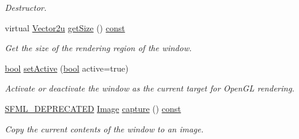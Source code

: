 \begin{DoxyCompactItemize}
\begin{DoxyCompactList}\small\item\em Destructor. \end{DoxyCompactList}\item 
virtual \hyperlink{namespacesf_a41039649eb65ea7646e2b97cfe124b4f}{Vector2u} \hyperlink{classsf_1_1_render_window_a2c7ff414be32621a453745cf2a0f8a3e}{get\-Size} () \hyperlink{term__entry_8h_a57bd63ce7f9a353488880e3de6692d5a}{const} 
\begin{DoxyCompactList}\small\item\em Get the size of the rendering region of the window. \end{DoxyCompactList}\item 
\hyperlink{term__entry_8h_a002004ba5d663f149f6c38064926abac}{bool} \hyperlink{classsf_1_1_render_window_aee6c53eced675e885931eb3e91f11155}{set\-Active} (\hyperlink{term__entry_8h_a002004ba5d663f149f6c38064926abac}{bool} active=true)
\begin{DoxyCompactList}\small\item\em Activate or deactivate the window as the current target for Open\-G\-L rendering. \end{DoxyCompactList}\item 
\hyperlink{sfml_2dep_2_s_f_m_l-2_84_82_2include_2_s_f_m_l_2_config_8hpp_a9d22ae32bba2961ae9abc7e40f035fc7}{S\-F\-M\-L\-\_\-\-D\-E\-P\-R\-E\-C\-A\-T\-E\-D} \hyperlink{classsf_1_1_image}{Image} \hyperlink{classsf_1_1_render_window_acd1967616b6ef482026b48f44fbf2624}{capture} () \hyperlink{term__entry_8h_a57bd63ce7f9a353488880e3de6692d5a}{const} 
\begin{DoxyCompactList}\small\item\em Copy the current contents of the window to an image. \end{DoxyCompactList}\end{DoxyCompactItemize}
